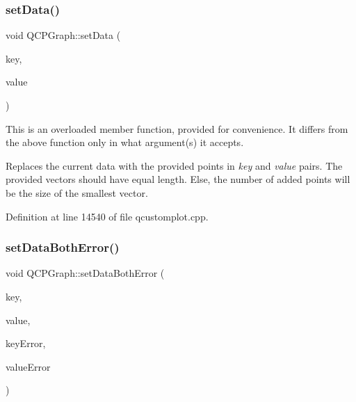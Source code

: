 \mbox{\label{class_q_c_p_graph_a4c55d8ac13bfa42c8c93747820891a76}} 
\subsubsection{\texorpdfstring{set\+Data()}{setData()}\hspace{0.1cm}{\footnotesize\ttfamily [2/2]}}
{\footnotesize\ttfamily void Q\+C\+P\+Graph\+::set\+Data (\begin{DoxyParamCaption}\item[{const Q\+Vector$<$ double $>$ \&}]{key,  }\item[{const Q\+Vector$<$ double $>$ \&}]{value }\end{DoxyParamCaption})}

This is an overloaded member function, provided for convenience. It differs from the above function only in what argument(s) it accepts.

Replaces the current data with the provided points in {\itshape key} and {\itshape value} pairs. The provided vectors should have equal length. Else, the number of added points will be the size of the smallest vector. 

Definition at line 14540 of file qcustomplot.\+cpp.

\mbox{\label{class_q_c_p_graph_a873fe46bdb20be5710428e474ade8908}} 
\subsubsection{\texorpdfstring{set\+Data\+Both\+Error()}{setDataBothError()}\hspace{0.1cm}{\footnotesize\ttfamily [1/2]}}
{\footnotesize\ttfamily void Q\+C\+P\+Graph\+::set\+Data\+Both\+Error (\begin{DoxyParamCaption}\item[{const Q\+Vector$<$ double $>$ \&}]{key,  }\item[{const Q\+Vector$<$ double $>$ \&}]{value,  }\item[{const Q\+Vector$<$ double $>$ \&}]{key\+Error,  }\item[{const Q\+Vector$<$ double $>$ \&}]{value\+Error }\end{DoxyParamCaption})}

